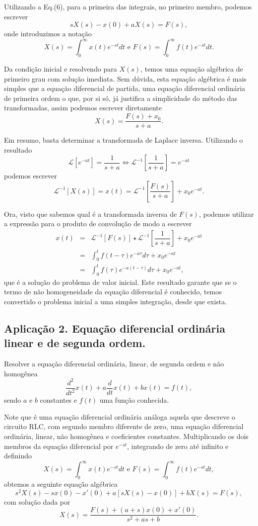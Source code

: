 Utilizando a Eq.(6), para a primeira das integrais, no primeiro membro, podemos escrever
$$s X(s) - x(0) + aX(s) = F(s),$$
onde introduzimos a notação
$$
X(s) =
\int_{0}^{\infty}
x(t) e^{-st}dt \mbox{ e }
F(s) =
\int_{0}^{\infty}
f(t) e^{-st}dt.$$

Da condição inicial e resolvendo para $X(s)$, temos uma equação algébrica de primeiro grau com solução imediata. Sem dúvida, esta equação algébrica é mais simples que a equação diferencial de partida, uma equação diferencial ordinária de primeira ordem o que, por si só, já justifica a simplicidade do método das transformadas, assim podemos escrever diretamente
$$X(s) =
\dfrac{F(s) + x_{0}}{s + a}.$$

Em resumo, basta determinar a transformada de Laplace inversa. Utilizando o resultado
$$\mathscr{L}[e^{-at}] =
\dfrac{1}{s + a}
\Leftrightarrow \mathscr{L}^{-1}
\left[
\dfrac{1}{s + a}
\right]
= e^{-at}$$
podemos escrever
$$\mathscr{L}^{-1}[X(s)] = x(t) = \mathscr{L}^{-1}
\left[
\dfrac{F(s)}{s + a}
\right]
+ x_{0} e^{-at}.$$

Ora, visto que sabemos qual é a transformada inversa de $F(s)$, podemos utilizar a expressão para o produto de convolução de modo a escrever
$$\begin{array}{rcl}
x(t)
&=&
\mathscr{L}^{-1}[F(s)] \star \mathscr{L}^{-1}
\left[
\dfrac{1}{s + a}
\right]
+ x_{0} e^{-at} \\
&=&
\int_{0}^{t} f(t - \tau) e^{-a\tau} d\tau + x_{0} e^{-at} \\
&=& \displaystyle
\int_{0}^{t} f(\tau) e^{-a(t-\tau)} d\tau + x_{0} e^{-at},
\end{array}$$
que é a solução do problema de valor inicial. Este resultado garante que se o termo de não homogeneidade da equação diferencial é conhecido, temos convertido o problema inicial a uma simples integração, desde que exista.

\subsection{Aplicação 2. Equação diferencial ordinária linear e de segunda ordem.}

Resolver a equação diferencial ordinária, linear, de segunda ordem e não homogênea
$$\dfrac{d^{2}}{dt^{2}} x(t) + a \dfrac{d}{dt}
x(t) + b x(t) = f(t),$$
sendo $a$ e $b$ constantes e $f(t)$ uma função conhecida.

Note que é uma equação diferencial ordinária análoga aquela que descreve o circuito RLC, com segundo membro diferente de zero, uma equação diferencial ordinária, linear, não homogênea e coeficientes constantes. Multiplicando os dois membros da equação diferencial por $e^{-st}$, integrando de zero até infinito e definindo
$$X(s) =
\int_{0}^{\infty}
x(t) e^{-st}dt \mbox{ e } F(s) =
\int_{0}^{\infty}
f(t) e^{-st}dt,
$$
obtemos a seguinte equação algébrica
$$s^{2}X(s)-sx(0)-x'(0)+a[sX(s)-x(0)]+bX(s) = F(s),$$
com solução dada por
$$X(s) =
\dfrac{F(s) + (a + s)x(0) + x'(0)}{s^{2} + as + b}.$$

